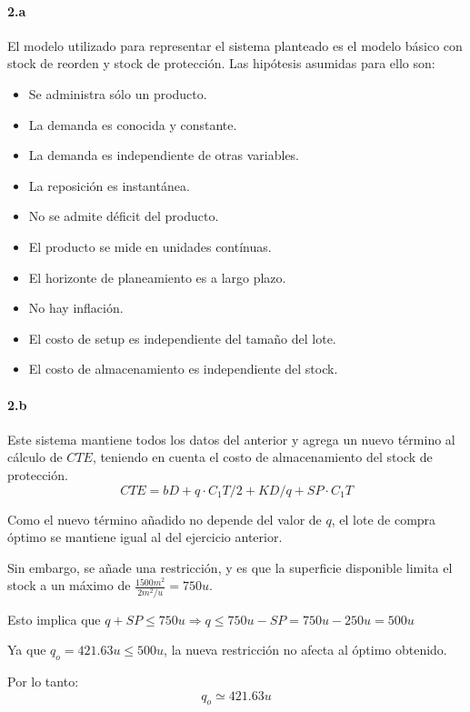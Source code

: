 \documentclass[a4paper,10pt]{article}
\begin{document}
  \paragraph{2.a}
    El modelo utilizado para representar el sistema planteado es el modelo básico con stock de reorden y stock de protección. Las hipótesis asumidas para ello son:
    \begin{itemize}
      \item Se administra sólo un producto.
      \item La demanda es conocida y constante.
      \item La demanda es independiente de otras variables.
      \item La reposición es instantánea.
      \item No se admite déficit del producto.
      \item El producto se mide en unidades contínuas.
      \item El horizonte de planeamiento es a largo plazo.
      \item No hay inflación.
      \item El costo de setup es independiente del tamaño del lote.
      \item El costo de almacenamiento es independiente del stock.
    \end{itemize}

  \paragraph{2.b}
    Este sistema mantiene todos los datos del anterior y agrega un nuevo término al cálculo de $CTE$, teniendo en cuenta el costo de almacenamiento del stock de protección.
        $$ CTE = b D + q \cdot C_1 T / 2 + K D / q + SP \cdot C_1 T $$

    Como el nuevo término añadido no depende del valor de $q$, el lote de compra óptimo se mantiene igual al del ejercicio anterior.

    Sin embargo, se añade una restricción, y es que la superficie disponible limita el stock a un máximo de $\frac{1500m^2}{2m^2/u} = 750u $.

    Esto implica que $ q + SP \le 750u \Rightarrow q \le 750u - SP = 750u - 250u = 500u$

    Ya que $q_o = 421.63u \le 500u $, la nueva restricción no afecta al óptimo obtenido.
    
    Por lo tanto:
        $$ \boxed{ q_o \simeq 421.63u} $$
\end{document}

